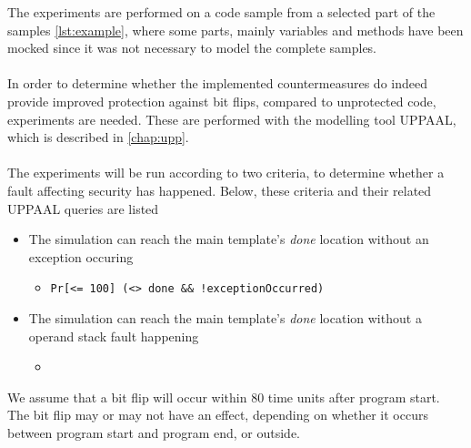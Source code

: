 The experiments are performed on a code sample from a selected part of the \jc samples \cref{lst:example}, where some parts, mainly variables and methods have been mocked since it was not necessary to model the complete samples.\\\\
In order to determine whether the implemented countermeasures do indeed provide improved protection against bit flips, compared to unprotected code, experiments are needed. These are performed with the modelling tool UPPAAL, which is described in \cref{chap:upp}.\\\\
The experiments will be run according to two criteria, to determine whether a fault affecting security has happened. Below, these criteria and their related UPPAAL queries are listed

\begin{itemize}
\item The simulation can reach the main template's \textit{done} location without an exception occuring
	\begin{itemize}
	\item \texttt{Pr[<= 100] (<> done \&\& !exceptionOccurred)}
	\end{itemize}
\item The simulation can reach the main template's \textit{done} location without a operand stack fault happening
	\begin{itemize}
	\item
	\end{itemize}
\end{itemize}

We assume that a bit flip will occur within $80$ time units after program start. The bit flip may or may not have an effect, depending on whether it occurs between program start and program end, or outside.